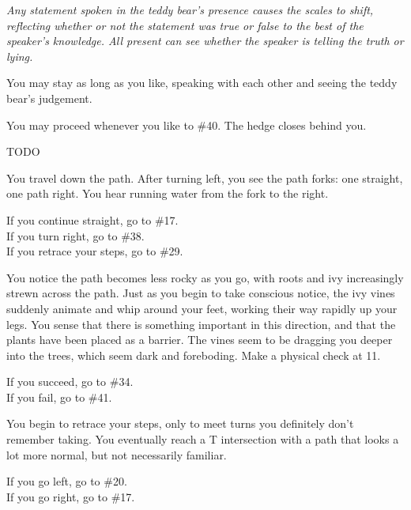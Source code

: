 \documentclass[green]{gl2018}
\begin{document}
\begin{large}
\begin{location}{5}
\textit{Any statement spoken in the teddy bear's presence causes the scales to shift, reflecting whether or not the statement was true or false to the best of the speaker's knowledge.  All present can see whether the speaker is telling the truth or lying.}

You may stay as long as you like, speaking with each other and seeing the teddy bear's judgement. 

\begin{fromhere}
You may proceed whenever you like to \#40.  The hedge closes behind you.
\end{fromhere}
\end{location}
\begin{location}{6}
TODO
\end{location}
\begin{location}{7}
You travel down the path. After turning left, you see the path forks: one straight, one path right. You hear running water from the fork to the right. 
\begin{fromhere}
If you continue straight, go to \#17.\\
If you turn right,  go to \#38.\\
  If you retrace your steps, go to \#29.
\end{fromhere}
\end{location}
\begin{location}{8}
You notice the path becomes less rocky as you go, with roots and ivy increasingly strewn across the path.  Just as you begin to take conscious notice, the ivy vines suddenly animate and whip around your feet, working their way rapidly up your legs.  You sense that there is something important in this direction, and that the plants have been placed as a barrier.  The vines seem to be dragging you deeper into the trees, which seem dark and foreboding.  Make a physical check at 11.
\begin{fromhere}
If you succeed, go to \#34.\\
  If you fail, go to \#41.
\end{fromhere}
\end{location}
\begin{location}{9}
You begin to retrace your steps, only to meet turns you definitely don't remember taking. You eventually reach a T intersection with a path that looks a lot more normal, but not necessarily familiar.
\begin{fromhere}
 If you go left, go to \#20.\\
 If you go right, go to \#17.
\end{fromhere}

\end{location}
\end{large}
\end{document}
